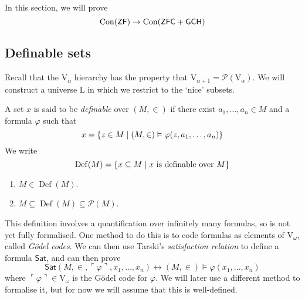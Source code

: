 In this section, we will prove
\[ \operatorname{Con}(\mathsf{ZF}) \to \operatorname{Con}(\mathsf{ZFC} + \mathsf{GCH}) \]

\subsection{Definable sets}
Recall that the \( \mathrm{V}_\alpha \) hierarchy has the property that \( \mathrm{V}_{\alpha + 1} = \mathcal P(\mathrm{V}_\alpha) \).
We will construct a universe \( \mathrm{L} \) in which we restrict to the `nice' subsets.
\begin{definition}
    A set \( x \) is said to be \emph{definable} over \( (M, \in) \) if there exist \( a_1, \dots, a_n \in M \) and a formula \( \varphi \) such that
    \[ x = \qty{z \in M \mid (M, \in) \vDash \varphi(z, a_1, \dots, a_n)} \]
    We write
    \[ \operatorname{Def}(M) = \qty{x \subseteq M \mid x \text{ is definable over } M} \]
\end{definition}
\begin{remark}
    \begin{enumerate}
        \item \( M \in \operatorname{Def}(M) \).
        \item \( M \subseteq \operatorname{Def}(M) \subseteq \mathcal P(M) \).
    \end{enumerate}
\end{remark}
This definition involves a quantification over infinitely many formulas, so is not yet fully formalised.
One method to do this is to code formulas as elements of \( \mathrm{V}_\omega \), called \emph{G\"odel codes}.
We can then use Tarski's \emph{satisfaction relation} to define a formula \( \mathsf{Sat} \), and can then prove
\[ \mathsf{Sat}(M, \in, \ulcorner \varphi \urcorner, x_1, \dots, x_n) \leftrightarrow (M, \in) \vDash \varphi(x_1, \dots, x_n) \]
where \( \ulcorner \varphi \urcorner \in \mathrm{V}_\omega \) is the G\"odel code for \( \varphi \).
We will later use a different method to formalise it, but for now we will assume that this is well-defined.

